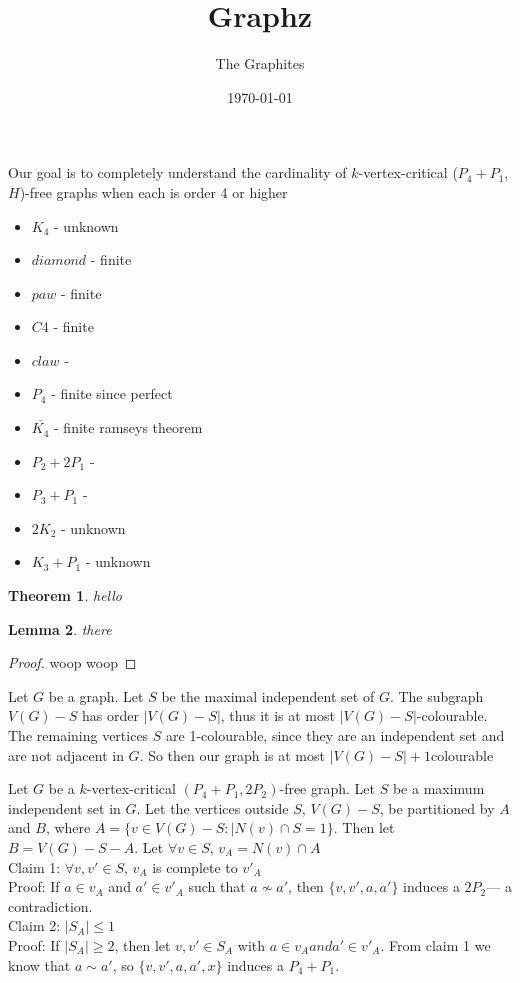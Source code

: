 \documentclass[12pt]{article}
\title{Graphz}
\author{The Graphites}
\date{\today}
\newtheorem{theorem}{Theorem}[section]
\newtheorem{lemma}[theorem]{Lemma}
\begin{document}
\maketitle
Our goal is to completely understand the cardinality of $k$-vertex-critical ($P_4 + P_1$,$H$)-free graphs when each is order 4 or higher
\begin{itemize}
\item $K_4$ - unknown
\item $diamond$ - finite ~\cite{gemfree}
\item $paw$ - finite ~\cite{gemfree}
\item $C4$ - finite ~\cite{p6c4free}
\item $claw$ - ~\cite{clawfree}
\item $P_4$ - finite since perfect
\item $\overline{K_4}$ - finite ramseys theorem
\item $P_2 + 2P_1$ - ~\cite{dichotomizing}
\item $P_3 + P_1$ - ~\cite{dichotomizing}
\item $2K_2$ - unknown
\item $K_3 + P_1$ - unknown
\end{itemize}
\begin{theorem}
hello
\end{theorem}
\begin{lemma}
there
\end{lemma}

\begin{proof}

woop woop
\end{proof}
Let $G$ be a graph. Let $S$ be the maximal independent set of $G$. The subgraph $V(G) - S$ has order $|V(G) - S|$, thus it is at most $|V(G) - S|$-colourable. The remaining vertices $S$ are 1-colourable, since they are an independent set and are not adjacent in $G$. So then our graph is at most $|V(G) - S| + 1$colourable

Let $G$ be a $k$-vertex-critical $(P_4 + P_1, 2P_2)$-free graph. Let $S$ be a maximum independent set in $G$. Let the vertices outside $S$, $V(G) - S$, be partitioned by $A$ and $B$, where $A = \{v \in V(G) - S : |N(v) \cap S = 1\}$. Then let $B = V(G) - S - A$.
Let $\forall v \in S$, $v_A = N(v) \cap A$\\
Claim 1: $\forall v,v' \in S$, $v_A$ is complete to $v'_A$\\
Proof: If $a \in v_A$ and $a' \in v'_A$ such that $a \not \sim a'$, then $\{v, v', a, a'\}$ induces a $2P_2$--- a contradiction.\\
Claim 2: $|S_A| \leq 1$\\
Proof: If $|S_A| \geq 2$, then let $v, v' \in S_A$ with $a\in v_A and a' \in v'_A$. From claim 1 we know that $a \sim a'$, so $\{v, v', a, a', x\}$ induces a $P_4 + P_1$.
\end{document}
